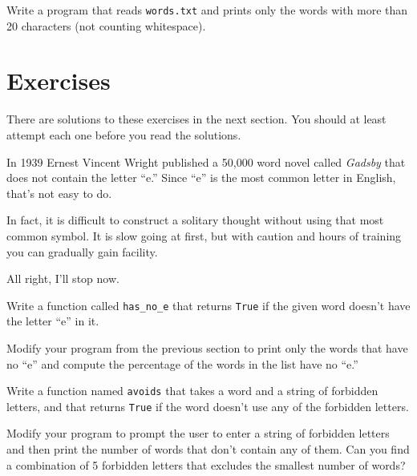 \documentclass[10pt]{book}
\begin{document}
\begin{exercise}

Write a program that reads {\tt words.txt} and prints only the
words with more than 20 characters (not counting whitespace).

\end{exercise}


\section{Exercises}

There are solutions to these exercises in the next section.
You should at least attempt each one before you read the solutions.

\begin{exercise}

In 1939 Ernest Vincent Wright published a 50,000 word novel called
{\em Gadsby} that does not contain the letter ``e.''  Since ``e'' is
the most common letter in English, that's not easy to do.

In fact, it is difficult to construct a solitary thought without using
that most common symbol.  It is slow going at first, but with caution
and hours of training you can gradually gain facility.

All right, I'll stop now.

Write a function called \verb"has_no_e" that returns {\tt True} if
the given word doesn't have the letter ``e'' in it.

Modify your program from the previous section to print only the words
that have no ``e'' and compute the percentage of the words in the list
have no ``e.''

\end{exercise}


\begin{exercise} 

Write a function named {\tt avoids}
that takes a word and a string of forbidden letters, and
that returns {\tt True} if the word doesn't use any of the forbidden
letters.

Modify your program to prompt the user to enter a string
of forbidden letters and then print the number of words that
don't contain any of them.
Can you find a combination of 5 forbidden letters that
excludes the smallest number of words?

\end{exercise}
\end{document}
